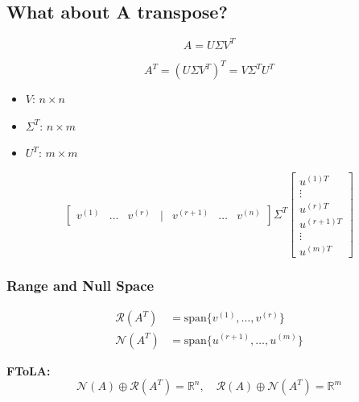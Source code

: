 \begin{derivation}
\end{derivation}

\subsection{What about A transpose?}
\begin{definition}
    \begin{equation*}
        A = U \Sigma V^T
        \end{equation*}
        
        \begin{equation*}
        A^T = (U \Sigma V^T)^T = V \Sigma^T U^T
        \end{equation*}
        \begin{itemize}
            \item $V$: $n \times n$
            \item $\Sigma^T$: $n \times m$
            \item $U^T$: $m \times m$
        \end{itemize}
        \begin{equation*}
            \begin{bmatrix}
            v^{(1)} & \ldots & v^{(r)} & | & v^{(r+1)} & \ldots & v^{(n)}
            \end{bmatrix}
            \Sigma^T
            \begin{bmatrix}
                u^{(1)T} \\ \vdots \\ u^{(r)T} \\ u^{(r+1)T} \\ \vdots \\ u^{(m)T}
            \end{bmatrix}
        \end{equation*}
\end{definition}

\subsubsection{Range and Null Space}
\begin{definition}
    \begin{align*}
        \mathcal{R}(A^T) &= \text{span}\{v^{(1)}, \ldots, v^{(r)}\} \\
        \mathcal{N}(A^T) &= \text{span}\{u^{(r+1)}, \ldots, u^{(m)}\}
    \end{align*}
    
    \vspace{1em}

    \textbf{FToLA:}
    \begin{equation*}
    \mathcal{N}(A) \oplus \mathcal{R}(A^T) = \mathbb{R}^n, \quad \mathcal{R}(A) \oplus \mathcal{N}(A^T) = \mathbb{R}^m
    \end{equation*}
\end{definition}

